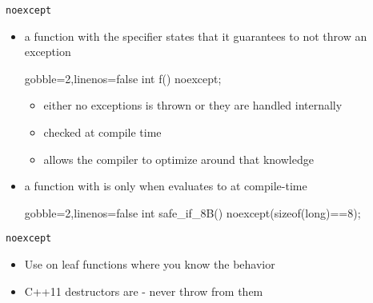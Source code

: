 \begin{frame}[fragile]
  \begin{block}{\texttt{noexcept}}
    \begin{itemize}
      \item a function with the  specifier states that it guarantees to not throw an exception
      \begin{cppcode*}{gobble=2,linenos=false}
        int f() noexcept;
      \end{cppcode*}
      \begin{itemize}
        \item either no exceptions is thrown or they are handled internally
        \item checked at compile time
        \item allows the compiler to optimize around that knowledge
      \end{itemize}
      \item a function with  is only  when  evaluates to  at compile-time
      \begin{cppcode*}{gobble=2,linenos=false}
        int safe_if_8B() noexcept(sizeof(long)==8);
      \end{cppcode*}
    \end{itemize}
  \end{block}
  \begin{goodpractice}{\texttt{noexcept}}
    \begin{itemize}
      \item Use  on leaf functions where you know the behavior
      \item C++11 destructors are  - never throw from them
    \end{itemize}
  \end{goodpractice}
\end{frame}

